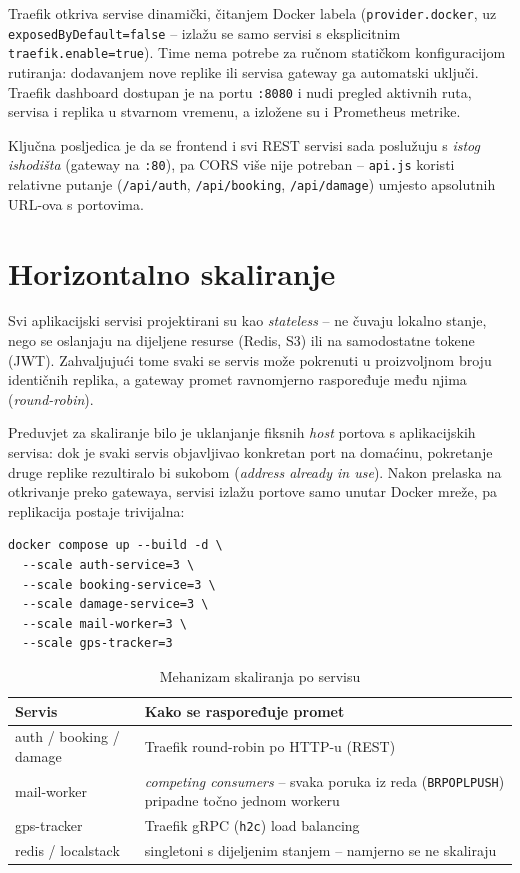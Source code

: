 \documentclass[12pt,a4paper]{article}
\begin{document}
Traefik otkriva servise dinamički, čitanjem Docker labela (\texttt{provider.docker}, uz \texttt{exposedByDefault=false} -- izlažu se samo servisi s eksplicitnim \texttt{traefik.enable=true}). Time nema potrebe za ručnom statičkom konfiguracijom rutiranja: dodavanjem nove replike ili servisa gateway ga automatski uključi. Traefik dashboard dostupan je na portu \texttt{:8080} i nudi pregled aktivnih ruta, servisa i replika u stvarnom vremenu, a izložene su i Prometheus metrike.

Ključna posljedica je da se frontend i svi REST servisi sada poslužuju s \emph{istog ishodišta} (gateway na \texttt{:80}), pa CORS više nije potreban -- \texttt{api.js} koristi relativne putanje (\texttt{/api/auth}, \texttt{/api/booking}, \texttt{/api/damage}) umjesto apsolutnih URL-ova s portovima.

\section{Horizontalno skaliranje}

Svi aplikacijski servisi projektirani su kao \emph{stateless} -- ne čuvaju lokalno stanje, nego se oslanjaju na dijeljene resurse (Redis, S3) ili na samodostatne tokene (JWT). Zahvaljujući tome svaki se servis može pokrenuti u proizvoljnom broju identičnih replika, a gateway promet ravnomjerno raspoređuje među njima (\emph{round-robin}).

Preduvjet za skaliranje bilo je uklanjanje fiksnih \emph{host} portova s aplikacijskih servisa: dok je svaki servis objavljivao konkretan port na domaćinu, pokretanje druge replike rezultiralo bi sukobom (\emph{address already in use}). Nakon prelaska na otkrivanje preko gatewaya, servisi izlažu portove samo unutar Docker mreže, pa replikacija postaje trivijalna:

\begin{lstlisting}[caption={Skaliranje na proizvoljan broj replika}]
docker compose up --build -d \
  --scale auth-service=3 \
  --scale booking-service=3 \
  --scale damage-service=3 \
  --scale mail-worker=3 \
  --scale gps-tracker=3
\end{lstlisting}

\begin{table}[H]
\centering
\caption{Mehanizam skaliranja po servisu}
\label{tab:scaling}
\begin{tabularx}{\textwidth}{l X}
\toprule
\textbf{Servis} & \textbf{Kako se raspoređuje promet} \\
\midrule
auth / booking / damage & Traefik round-robin po HTTP-u (REST) \\
mail-worker             & \emph{competing consumers} -- svaka poruka iz reda (\texttt{BRPOPLPUSH}) pripadne točno jednom workeru \\
gps-tracker             & Traefik gRPC (\texttt{h2c}) load balancing \\
redis / localstack      & singletoni s dijeljenim stanjem -- namjerno se ne skaliraju \\
\bottomrule
\end{tabularx}
\end{table}
\end{document}
